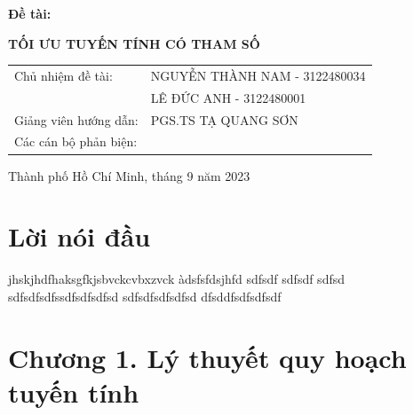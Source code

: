 \documentclass{article}
\begin{document}
\begin{titlepage}
\begin{center}
                \end{center}
                \begin{center}
                \hspace{15pt}\textbf{\fontsize{30pt}{0pt}\selectfont Đề tài:}
                \end{center}
                \begin{center}
                    \begin{center}
                \textbf{\fontsize{20pt}{0pt}\selectfont TỐI ƯU TUYẾN TÍNH CÓ THAM SỐ} 
                    \end{center}
                \vspace{1cm}
                \begin{table}[H]
                    \centering
                    \begin{tabular}{l l}
                \fontsize{14pt}{0pt}\selectfont Chủ nhiệm đề tài:     & \fontsize{14pt}{0pt}\selectfont NGUYỄN THÀNH NAM - 3122480034 \vspace{6pt}\\     
                  & \fontsize{14pt}{0pt}\selectfont LÊ ĐỨC ANH - 3122480001 \vspace{6pt}\\
                \fontsize{14pt}{0pt}\selectfont Giảng viên hướng dẫn: & \fontsize{14pt}{0pt}\selectfont PGS.TS TẠ QUANG SƠN \vspace{6pt}\\
                \fontsize{14pt}{0pt}\selectfont Các cán bộ phản biện:
                
               
                \end{tabular}
                \end{table}
                \vspace{0.5cm}
                \fontsize{14pt}{0pt}\selectfont Thành phố Hồ Chí Minh, tháng 9 năm 2023
                \end{center}
            \end{titlepage}
            \cleardoublepage
\tableofcontents
\section*{Lời nói đầu}
jhskjhdfhaksgfkjsbvckcvbxzvck
àdsfsfdsjhfd
sdfsdf
sdfsdf
sdfsd\\
sdfsdfsdfssdfsdfsdfsd
sdfsdfsdfsdfsd
dfsddfsdfsdfsdf
\cleardoublepage
\section*{Chương 1. Lý thuyết quy hoạch tuyến tính}
\end{document}
